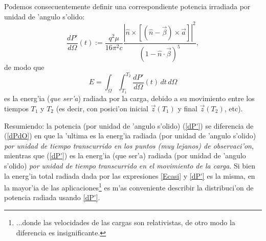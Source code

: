 Podemos consecuentemente definir una correspondiente potencia irradiada por unidad de 'angulo s'olido:
\begin{equation}
\boxed{\frac{dP'}{d\Omega}(t):=\frac{q^2\mu}{16\pi^2 c}\frac{\left|\hat{n}\times
\left[ \left( \hat{n}-\vec{\beta}\right)\times{\vec{a}}\right]\right|^2}{\left(
1-\hat{n}\cdot\vec{\beta}\right) ^{5}},} \label{dP'}
\end{equation}
de modo que
\begin{equation}
 \boxed{E=\int_\Omega\int_{T_1}^{T_2}\frac{dP'}{d\Omega}(t)\,dt\,d\Omega}
\end{equation}
es la energ'ia (\textit{que ser'a}) radiada por la carga, debido a su movimiento entre los tiempos $T_1$ y $T_2$ (es decir, con posici'on inicial $\vec{z}(T_1)$ y final $\vec{z}(T_2)$, etc).

Resumiendo: la potencia (por unidad de 'angulo s'olido) (\ref{dP'}) se diferencia de (\ref{dPdO}) en que la 'ultima es la energ'ia radiada (por unidad de 'angulo s'olido) \textit{por unidad de tiempo transcurrido en los puntos (muy lejanos) de observaci'on}, mientras que (\ref{dP'}) es la energ'ia (que ser'a) radiada (por unidad de 'angulo s'olido) \textit{por unidad de tiempo transcurrido en el movimiento de la carga}. Si bien la energ'ia total radiada dada por las expresiones \eqref{Ecasi} y \eqref{dP'} es la misma, en la mayor'ia de las aplicaciones\footnote{...donde las velocidades de las cargas son relativistas, de otro modo la diferencia es insignificante.} es m'as conveniente describir la distribuci'on de potencia radiada usando \eqref{dP'}.

